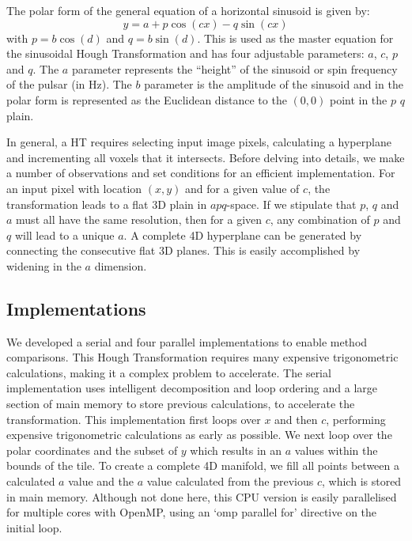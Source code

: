 The polar form of the general equation of a horizontal sinusoid is given by:
\begin{equation} \label{eq:masterPolar}
y = a + p \cos\left(cx\right) - q \sin \left( cx \right ) 
\end{equation}
with $ p = b \cos\left(d\right)$ and $ q =b \sin \left( d \right)$. This is used as the master equation for the sinusoidal Hough Transformation and has four adjustable parameters: $a$, $c$, $p$ and $q$. The $a$ parameter represents the ``height'' of the sinusoid or spin frequency of the pulsar (in Hz). The $b$ parameter is the amplitude of the sinusoid and in the polar form is represented as the Euclidean distance to the $(0,0)$ point in the $p$ $q$ plain.

In general, a HT requires selecting input image pixels, calculating a hyperplane and incrementing all voxels that it intersects. Before delving into details, we make a number of observations and set conditions for an efficient implementation. For an input pixel with location $(x, y)$ and for a given value of $c$, the transformation leads to a flat 3D plain in $apq$-space. If we stipulate that $p$, $q$ and $a$ must all have the same resolution, then for a given $c$, any combination of $p$ and $q$ will lead to a unique $a$. A complete 4D hyperplane can be generated by connecting the consecutive flat 3D planes. This is easily accomplished by widening in the $a$ dimension.

\subsection{Implementations}

We developed a serial and four parallel implementations to enable method comparisons. This Hough Transformation requires many expensive trigonometric calculations, making it a complex problem to accelerate. The serial implementation uses intelligent decomposition and loop ordering and a large section of main memory to store previous calculations, to accelerate the transformation. This implementation first loops over $x$ and then $c$, performing expensive trigonometric calculations as early as possible. We next loop over the polar coordinates and the subset of $y$ which results in an $a$ values within the bounds of the tile. To create a complete 4D manifold, we fill all points between a calculated $a$ value and the $a$ value calculated from the previous $c$, which is stored in main memory. Although not done here, this CPU version is easily parallelised for multiple cores with OpenMP, using an `omp parallel for' directive on the initial loop.

